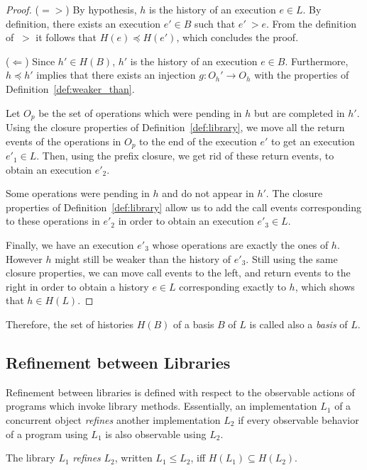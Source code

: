 \begin{proof}
($=>$) By hypothesis, $h$ is the history of an execution $e\in L$.  By definition, there exists
an execution $e'\in B$ such that $e' ~> e$. 
From the definition of $~>$ it follows that $H(e)\preceq H(e')$, 
which concludes the proof.


($\Leftarrow$) Since $h'\in H(B)$, $h'$ is the history of an execution $e\in B$. Furthermore,
 $h\preceq h'$ implies that there exists an injection $g: O_h' \rightarrow O_h$ with the 
properties of Definition~\ref{def:weaker_than}. 

Let $O_p$ be the set of operations which were pending in $h$ but are completed in $h'$.
Using the closure properties of Definition~\ref{def:library}, we move all the return
events of the operations in $O_p$ to the end of the execution $e'$ to get an 
execution $e'_1 \in L$.
Then, using the prefix closure, we get rid of these return events, to obtain an 
execution $e'_2$.

Some operations were pending in $h$ and do not appear in $h'$. The closure
properties of Definition~\ref{def:library} allow us to add the call events corresponding
to these operations in $e'_2$ in order to obtain an execution $e'_3 \in L$.

Finally, we have an execution $e'_3$ whose operations are exactly the ones of $h$.
However $h$ might still be weaker than the history of $e'_3$. Still using the same 
closure properties, we can move call events to the left, and return events to the right
in order to obtain a history $e \in L$ corresponding exactly to $h$, which shows
that $h \in H(L)$.
\end{proof}


Therefore, the set of histories $H(B)$ of a basis $B$ of $L$ is called also a \emph{basis} of $L$.

\subsection{Refinement between Libraries}

Refinement between libraries is defined with respect to the observable actions
of programs which invoke library methods. Essentially, an implementation $L_1$ of a
concurrent object \emph{refines} another implementation $L_2$ if every
observable behavior of a program using $L_1$ is also observable using $L_2$.

\begin{definition}

  The library $L_1$ \emph{refines} $L_2$, written $L_1 \leq L_2$, iff $H(L_1)\subseteq H(L_2)$.
  
\end{definition}

